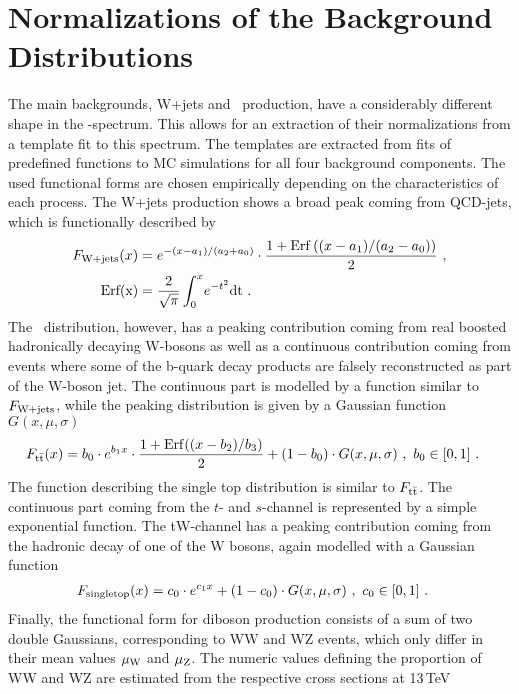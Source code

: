 \section{Normalizations of the Background Distributions}
\label{sec:bkgnorms}
The main backgrounds, W+jets and \ttbar \ production, have a considerably different shape in the \Mpr -spectrum. This allows for an extraction of their normalizations from a template fit to this spectrum. The templates are extracted from fits of predefined functions to MC simulations for all four background components. The used functional forms are chosen empirically depending on the characteristics of each process. The W+jets production shows a broad peak coming from QCD-jets, which is functionally described by
\begin{align}
F_{\rm W+jets}(x) &= e^{-(x-a_1)/\left(a_2+a_0\right)} \cdot \frac{1 + {\rm Erf}\left((x-a_1)/(a_2-a_0) \right)}{2} ~ , \\
{\rm Erf(x)} &= \frac{2}{\sqrt{\pi}}\int_0^x \! e^{-t^2}{\rm dt} ~ .
\end{align}
The \ttbar \ distribution, however, has a peaking contribution coming from real boosted hadronically decaying W-bosons as well as a continuous contribution coming from events where some of the b-quark decay products are falsely reconstructed as part of the W-boson jet. The continuous part is modelled by a function similar to $F_{\rm W+jets}$, while the peaking distribution is given by a Gaussian function $G(x,\mu,\sigma)$
\begin{align}
F_{\mathrm{t}\bar{\mathrm{t}}}(x) &= b_0 \cdot e^{b_1 x} \cdot \frac{1 + {\rm Erf}((x-b_2)/b_3)}{2} + (1-b_0)\cdot G(x,\mu,\sigma) ~ , ~ b_0 \in [0,1] ~ .
\end{align}
The function describing the single top distribution is similar to $F_{\mathrm{t}\bar{\mathrm{t}}}$. The continuous part coming from the $t$- and $s$-channel is represented by a simple exponential function. The tW-channel has a peaking contribution coming from the hadronic decay of one of the W bosons, again modelled with a Gaussian function 
\begin{align}
F_{\rm singletop}(x) &= c_0\cdot e^{c_1 x} + (1-c_0)\cdot G(x,\mu,\sigma) ~ , ~ c_0 \in [0,1] ~ .
\end{align}
Finally, the functional form for diboson production consists of a sum of two double Gaussians, corresponding to WW and WZ events, which only differ in their mean values $\mu_{\rm W}$ and $\mu_{\rm Z}$. The numeric values defining the proportion of WW and WZ are estimated from the respective cross sections at 13\,TeV \cite{WWxsec,WZxsec}
